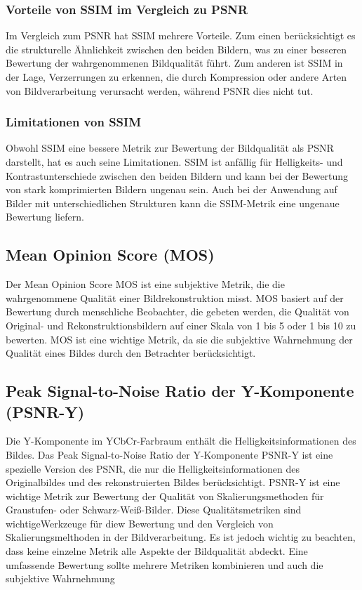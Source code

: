         \subsubsection{Vorteile von SSIM im Vergleich zu PSNR}
        
            Im Vergleich zum PSNR hat SSIM mehrere Vorteile. Zum einen berücksichtigt es die strukturelle Ähnlichkeit zwischen den beiden Bildern, was zu einer besseren Bewertung der wahrgenommenen Bildqualität führt. 
            Zum anderen ist SSIM in der Lage, Verzerrungen zu erkennen, die durch Kompression oder andere Arten von Bildverarbeitung verursacht werden, während PSNR dies nicht tut.
        
        \subsubsection{Limitationen von SSIM}
        
            Obwohl SSIM eine bessere Metrik zur Bewertung der Bildqualität als PSNR darstellt, hat es auch seine Limitationen. 
            SSIM ist anfällig für Helligkeits- und Kontrastunterschiede zwischen den beiden Bildern und kann bei der Bewertung von stark komprimierten Bildern ungenau sein. 
            Auch bei der Anwendung auf Bilder mit unterschiedlichen Strukturen kann die SSIM-Metrik eine ungenaue Bewertung liefern.
    \subsection{Mean Opinion Score (MOS)}
        Der Mean Opinion Score \ac{MOS} ist eine subjektive Metrik, die die wahrgenommene Qualität einer Bildrekonstruktion misst.
        MOS basiert auf der Bewertung durch menschliche Beobachter, die gebeten werden, die Qualität von Original- und Rekonstruktionsbildern auf einer Skala von 1 bis 5 oder 1 bis 10 zu bewerten.
        MOS ist eine wichtige Metrik, da sie die subjektive Wahrnehmung der Qualität eines Bildes durch den Betrachter berücksichtigt.
        
    \subsection{Peak Signal-to-Noise Ratio der Y-Komponente (PSNR-Y)}
        Die Y-Komponente im YCbCr-Farbraum enthält die Helligkeitsinformationen des Bildes. 
        Das Peak Signal-to-Noise Ratio der Y-Komponente \ac{PSNR-Y} ist eine spezielle Version des PSNR, die nur die Helligkeitsinformationen des Originalbildes und des rekonstruierten Bildes berücksichtigt. 
        PSNR-Y ist eine wichtige Metrik zur Bewertung der Qualität von Skalierungsmethoden für Graustufen- oder Schwarz-Weiß-Bilder.        
        Diese Qualitätsmetriken sind wichtigeWerkzeuge für diew Bewertung und den Vergleich von Skalierungsmelthoden in der Bildverarbeitung.
        Es ist jedoch wichtig zu beachten, dass keine einzelne Metrik alle Aspekte der Bildqualität abdeckt. Eine umfassende Bewertung sollte mehrere Metriken kombinieren und auch die subjektive Wahrnehmung 
        

